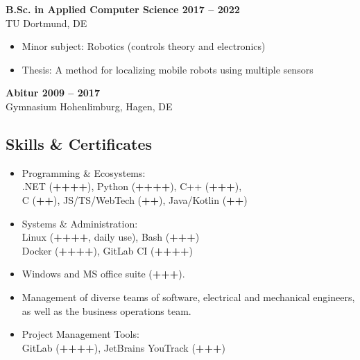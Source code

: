 \documentclass[a4paper,11pt]{article}
\newcommand{\subsectionskip}[0]{\vspace{0.125cm}}
\newcommand{\col}[2]{\textcolor[HTML]{#1}{#2}}
\begin{document}
\begin{minipage}[t]{0.65\textwidth}
    \subsectionskip

    \col{81879c}{\textbf{B.Sc. in Applied Computer Science \hfill 2017 -- 2022}} \\
    TU Dortmund, DE
    \begin{itemize}
        \small
        \item Minor subject: Robotics (controls theory and electronics)
        \item Thesis: A method for localizing mobile robots using multiple sensors
    \end{itemize}

    \subsectionskip

    \col{81879c}{\textbf{Abitur \hfill 2009 -- 2017}} \\
    Gymnasium Hohenlimburg, Hagen, DE

    \vspace{-0.5cm} %

    \begin{minipage}[t]{0.625\textwidth}
        \col{7690bb}{\section*{Skills \& Certificates}}
        \begin{itemize}
            \small
            \item Programming \& Ecosystems:\\
            .NET (\textbf{++++}), Python (\textbf{++++}), C++ (\textbf{+++}),\\
            C (\textbf{++}), JS/TS/WebTech (\textbf{++}), Java/Kotlin (\textbf{++})

            \item Systems \& Administration:\\
            Linux (\textbf{++++}, daily use), Bash (\textbf{+++}) \\
            Docker (\textbf{++++}), GitLab CI (\textbf{++++})

            \item Windows and MS office suite (\textbf{+++}).

            \item Management of diverse teams of software, electrical and mechanical engineers, as well as the business operations team.

            \item Project Management Tools:\\
            GitLab (\textbf{++++}), JetBrains YouTrack (\textbf{+++})


\end{itemize}
\end{minipage}
\end{minipage}
\end{document}
